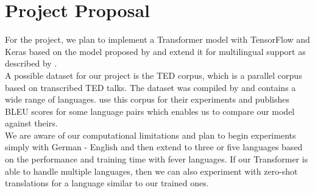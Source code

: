 \documentclass[article,accentcolor=tud8d,bibliography=totoc]{tudreport}
\begin{document}
\section{Project Proposal}
For the project, we plan to implement a Transformer model with TensorFlow and Keras based on the model proposed by \textcite{DBLP:journals/corr/VaswaniSPUJGKP17} and extend it for multilingual support as described by \textcite{DBLP:journals/corr/HaNW16,johnson2017google}.\\
A possible dataset for our project is the TED corpus, which is a parallel corpus based on transcribed TED talks. 
The dataset was compiled by \textcite{Ye2018WordEmbeddings} and contains a wide range of languages.
\textcite{DBLP:journals/corr/abs-1903-00089} use this corpus for their experiments and publishes BLEU scores \autocite{papineni2002bleu} for some language pairs which enables us to compare our model against theirs.\\
We are aware of our computational limitations and plan to begin experiments simply with German - English and then extend to three or five languages based on the performance and training time with fever languages.
If our Transformer is able to handle multiple languages, then we can also experiment with zero-shot translations for a language similar to our trained ones.

\printbibliography[title=References, heading=bibliography]
   
\end{document}
